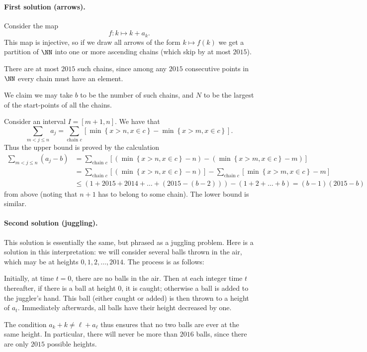 \documentclass[11pt]{scrartcl}
\begin{document}
\paragraph{First solution (arrows).}
Consider the map
\[ f \colon k \mapsto k + a_k. \]
This map is injective,
so if we draw all arrows of the form $k \mapsto f(k)$
we get a partition of $\NN$ into one or more ascending chains
(which skip by at most $2015$).

There are at most $2015$ such chains,
since among any $2015$ consecutive points in $\NN$
every chain must have an element.

We claim we may take $b$ to be the number of such chains,
and $N$ to be the largest of the start-points of all the chains.

Consider an interval $I = [m+1, n]$.
We have that
\[ \sum_{m<j\le n} a_j
  = \sum_{\text{chain } c}
  \left[ \min \left\{ x > n, x \in c \right\}
  - \min \left\{ x > m, x \in c \right\} \right]. \]
Thus the upper bound is proved by the calculation
\begin{align*}
  \sum_{m<j\le n} (a_j-b)
  &= \sum_{\text{chain } c}
    \left[ (\min \left\{ x > n, x \in c \right\} - n)
    - (\min \left\{ x > m, x \in c \right\} - m) \right] \\
  &= \sum_{\text{chain } c}
    \left[ (\min \left\{ x > n, x \in c \right\} - n) \right]
    - \sum_{\text{chain } c} \left[
    \min \left\{ x > m, x \in c \right\} - m \right] \\
  &\le (1+2015+2014+\dots+(2015-(b-2)))-(1+2+\dots+b) = (b-1)(2015-b)
\end{align*}
from above (noting that $n+1$ has to belong to some chain).
The lower bound is similar.

\paragraph{Second solution (juggling).}
This solution is essentially the same,
but phrased as a juggling problem.
Here is a solution in this interpretation:
we will consider several balls thrown in the air,
which may be at heights $0, 1, 2, \dots, 2014$.
The process is as follows:
\begin{itemize}
\ii Initially, at time $t = 0$, there are no balls in the air.
\ii Then at each integer time $t$ thereafter,
if there is a ball at height $0$, it is caught;
otherwise a ball is added to the juggler's hand.
This ball (either caught or added) is then thrown to a height of $a_t$.
\ii Immediately afterwards, all balls have their height decreased by one.
\end{itemize}
The condition $a_k + k \neq \ell + a_\ell$ thus ensures that
no two balls are ever at the same height.
In particular, there will never be more than $2016$ balls,
since there are only $2015$ possible heights.
\end{document}
